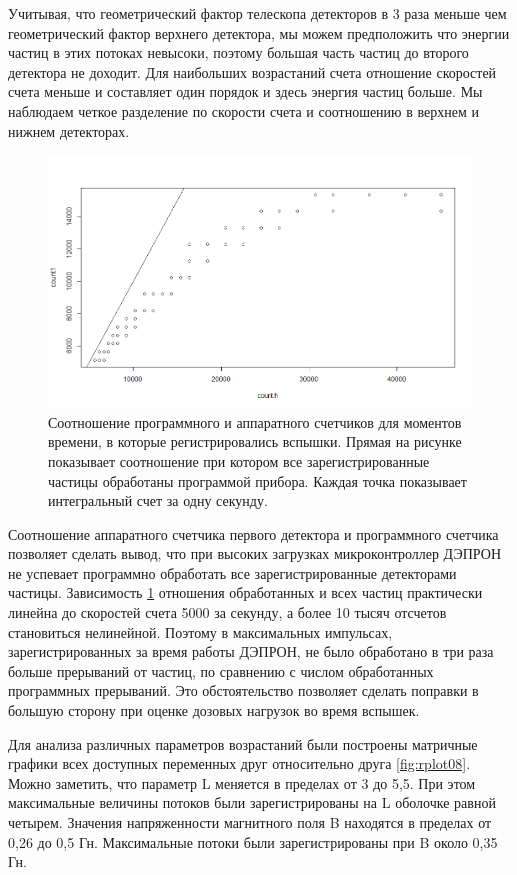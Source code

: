 Учитывая, что геометрический фактор телескопа детекторов в 3 раза меньше чем геометрический фактор верхнего детектора, мы можем предположить что энергии частиц в этих потоках невысоки, поэтому большая часть частиц до второго детектора не доходит.	Для наибольших возрастаний счета отношение скоростей счета меньше и составляет один порядок и здесь энергия частиц больше. Мы наблюдаем четкое разделение по скорости счета и соотношению в верхнем и нижнем детекторах. 
\begin{figure}[h]
	\centering
	\includegraphics[width=0.7\linewidth]{images/Flash/Rplot04}
	\caption{Соотношение программного и аппаратного счетчиков для моментов времени, в которые регистрировались вспышки. Прямая на рисунке показывает соотношение при котором все зарегистрированные частицы обработаны программой прибора. Каждая точка показывает интегральный счет за одну секунду.}
	\label{fig:rplot04}
\end{figure}
Соотношение аппаратного счетчика первого детектора и программного счетчика позволяет сделать вывод, что при высоких загрузках микроконтроллер ДЭПРОН не успевает программно обработать все зарегистрированные детекторами частицы. Зависимость \ref{fig:rplot04} отношения обработанных и всех частиц практически линейна до скоростей счета 5000 за секунду, а более 10 тысяч отсчетов становиться нелинейной. Поэтому в максимальных импульсах, зарегистрированных за время работы ДЭПРОН, не было обработано в три раза больше прерываний от частиц, по сравнению с числом обработанных программных прерываний. Это обстоятельство позволяет сделать поправки в большую сторону при оценке дозовых нагрузок во время вспышек. 

Для анализа различных параметров возрастаний были построены матричные графики всех доступных переменных друг относительно друга 	\ref{fig:rplot08}. Можно заметить, что параметр L меняется в пределах от 3 до 5,5. При этом максимальные величины потоков были зарегистрированы на L оболочке равной четырем. Значения напряженности магнитного поля B находятся в пределах от 0,26 до 0,5 Гн. Максимальные потоки были зарегистрированы при B около 0,35 Гн. 


